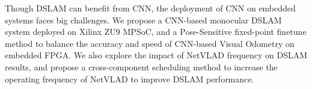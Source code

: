 \label{sec:conclusion} 

Though DSLAM can benefit from CNN, the deployment of CNN on embedded systems faces big challenges. We propose a CNN-based monocular DSLAM system deployed on Xilinx ZU9 MPSoC, and a Pose-Sensitive fixed-point finetune method to balance the accuracy and speed of CNN-based Visual Odometry on embedded FPGA. We also explore the impact of NetVLAD frequency on DSLAM results, and propose a cross-component scheduling method to increase the operating frequency of NetVLAD to improve DSLAM performance.